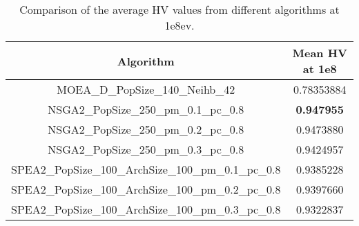 \begin{table}[!ht]
\centering
\begin{tabular}{|c|c|}
\hline
\textbf{Algorithm} & \textbf{Mean HV at 1e8} \\ \hline
MOEA\_D\_PopSize\_140\_Neihb\_42 & 0.78353884 \\ \hline
NSGA2\_PopSize\_250\_pm\_0.1\_pc\_0.8 & \textbf{0.947955} \\ \hline
NSGA2\_PopSize\_250\_pm\_0.2\_pc\_0.8 & 0.9473880 \\ \hline
NSGA2\_PopSize\_250\_pm\_0.3\_pc\_0.8 & 0.9424957 \\ \hline
SPEA2\_PopSize\_100\_ArchSize\_100\_pm\_0.1\_pc\_0.8 & 0.9385228 \\ \hline
SPEA2\_PopSize\_100\_ArchSize\_100\_pm\_0.2\_pc\_0.8 & 0.9397660 \\ \hline
SPEA2\_PopSize\_100\_ArchSize\_100\_pm\_0.3\_pc\_0.8 & 0.9322837 \\ \hline
\end{tabular}
\caption{Comparison of the average HV values from different algorithms at 1e8ev.}
\label{table:compare}
\end{table}